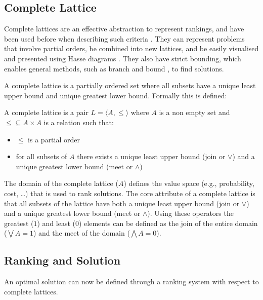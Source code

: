 \subsection{Complete Lattice}
Complete lattices are an effective abstraction to represent rankings,
and have been used before when describing such criteria \cite{Bistarelli1997,Fernandez}.
They can represent problems that involve partial orders,
be combined into new lattices,
and be easily visualised and presented using Hasse diagrams \cite{davey1990introduction}.
They also have strict bounding, which enables general methods, such as branch and bound \cite{Land1960}, to find solutions.

A complete lattice is a partially ordered set where all subsets have a unique least upper bound and unique greatest lower bound.
Formally this is defined:
\begin{defs}
A complete lattice is a pair $L = \langle A, \leq \rangle$ where $A$ is a non empty set 
and $\leq \subseteq A \times A$ is a relation such that:
\begin{itemize}
  \item $\leq$ is a partial order
  \item for all subsets of $A$ there exists a unique least upper bound (join or $\vee$) and a unique greatest lower bound (meet or $\wedge$)
\end{itemize}
\end{defs}

The domain of the complete lattice ($A$) defines the value space (e.g., probability, cost, \ldots) 
that is used to rank solutions. 
The core attribute of a complete lattice is that all subsets of the lattice have both a unique least upper bound (join or $\vee$) 
and a unique greatest lower bound (meet or $\wedge$).
Using these operators the greatest ($1$) and least ($0$) elements can be defined as
the join of the entire domain ($\bigvee A = 1$) and the meet of the domain ($\bigwedge A = 0$).

\subsection{Ranking and Solution}
An optimal solution can now be defined through a ranking system with respect to complete lattices.


